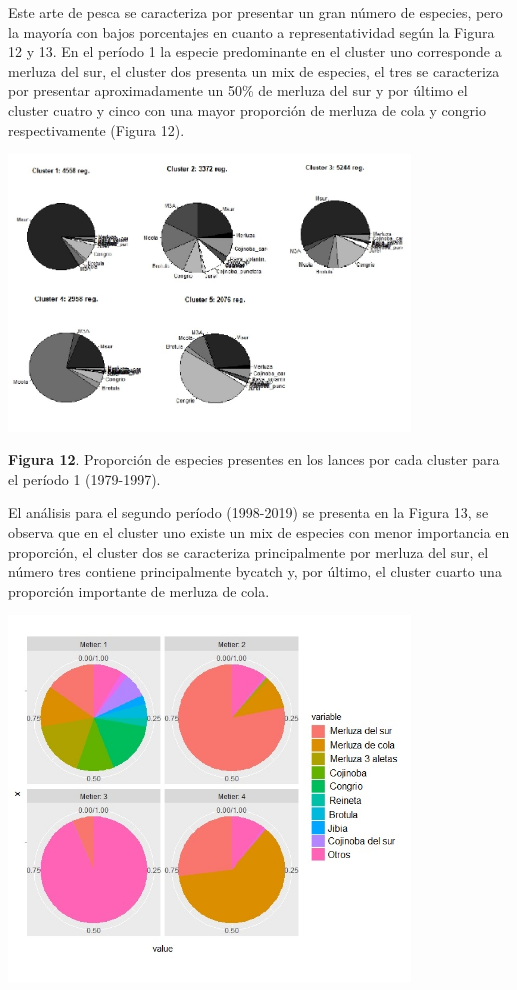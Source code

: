 \documentclass[
  spanish,
]{article}
\begin{document}
Este arte de pesca se caracteriza por presentar un gran número de
especies, pero la mayoría con bajos porcentajes en cuanto a
representatividad según la Figura 12 y 13. En el período 1 la especie
predominante en el cluster uno corresponde a merluza del sur, el cluster
dos presenta un mix de especies, el tres se caracteriza por presentar
aproximadamente un 50\% de merluza del sur y por último el cluster
cuatro y cinco con una mayor proporción de merluza de cola y congrio
respectivamente (Figura 12).

\begin{center}
\includegraphics[width=0.8\textwidth]{Figuras/Figura_12.png}
\end{center}

\small \textbf{Figura 12}. Proporción de especies presentes en los
lances por cada cluster para el período 1 (1979-1997). \vspace{0.5cm}
\normalsize

El análisis para el segundo período (1998-2019) se presenta en la Figura
13, se observa que en el cluster uno existe un mix de especies con menor
importancia en proporción, el cluster dos se caracteriza principalmente
por merluza del sur, el número tres contiene principalmente bycatch y,
por último, el cluster cuarto una proporción importante de merluza de
cola.

\begin{center}
\includegraphics[width=0.8\textwidth]{Figuras/Figura_13.png}
\end{center}
\end{document}
